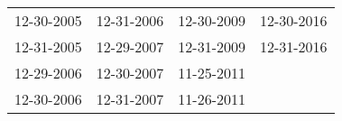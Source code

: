 \begin{supertabular}{llll}
 12-30-2005 &  12-31-2006 &  12-30-2009 &  12-30-2016 \\
 12-31-2005 &  12-29-2007 &  12-31-2009 &  12-31-2016 \\
 12-29-2006 &  12-30-2007 &  11-25-2011 &             \\
 12-30-2006 &  12-31-2007 &  11-26-2011 &             \\
\end{supertabular}
